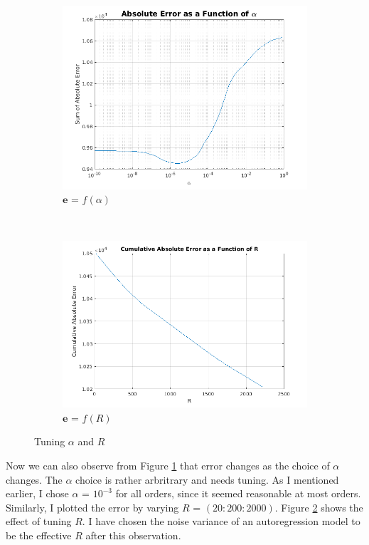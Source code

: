 \documentclass[11pt, fleqn]{article}
\begin{document}
\begin{figure}[!h]
    \centering
    \begin{subfigure}[b]{0.3\textwidth}
        \includegraphics[width=\textwidth]{error-vs-alpha-order-3.png}
	\caption{$\bm{e}$ = $f(\alpha)$}
	\label{fig:error-vs-alpha-order-3}
    \end{subfigure}
    ~ 
	\begin{subfigure}[b]{0.3\textwidth}
        \includegraphics[width=\textwidth]{error-vs-r.png}
	\caption{$\bm{e}$ = $f(R)$}
	\label{fig:error-vs-r}
    \end{subfigure}
	\caption{Tuning $\alpha$ and $R$}
	\label{fig:tuning-alpha-r}
\end{figure}

Now we can also observe from Figure \ref{fig:error-vs-alpha-order-3} that error changes as the choice of $\alpha$ changes. The $\alpha$ choice is rather arbritrary and needs tuning. As I mentioned earlier, I chose $\alpha$ = $10^{-3}$ for all orders, since it seemed reasonable at most orders. Similarly, I plotted the error by varying $R$ = $(20:200:2000)$. Figure \ref{fig:error-vs-r} shows the effect of tuning $R$. I have chosen the noise variance of an autoregression model to be the effective $R$ after this observation.\\
\end{document}
